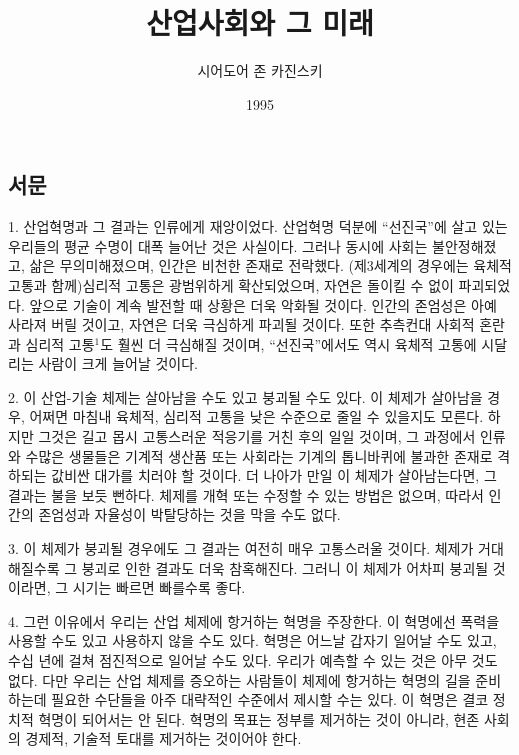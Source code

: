 \documentclass[11pt,a4paper]{article}
\title{산업사회와 그 미래}
\author{시어도어 존 카진스키}
\date{1995}
\begin{document}
\begin{multicols}{2}

\maketitle



\section*{서문}


1. 산업혁명과 그 결과는 인류에게 재앙이었다. 산업혁명 덕분에 “선진국”에 살고 있는 우리들의 평균  수명이 대폭 늘어난 것은 사실이다. 그러나 동시에 사회는 불안정해졌고, 삶은 무의미해졌으며, 인간은  비천한 존재로 전락했다. (제3세계의 경우에는 육체적 고통과 함께)심리적 고통은 광범위하게  확산되었으며, 자연은 돌이킬 수 없이 파괴되었다. 앞으로 기술이 계속 발전할 때 상황은 더욱 악화될  것이다. 인간의 존엄성은 아예 사라져 버릴 것이고, 자연은 더욱 극심하게 파괴될 것이다. 또한 추측컨대  사회적 혼란과 심리적 고통\hyperlink{1}{$^{1}$}도 훨씬 더 극심해질 것이며, “선진국”에서도 역시 육체적 고통에 시달리는  사람이 크게 늘어날 것이다.  


2. 이 산업-기술 체제는 살아남을 수도 있고 붕괴될 수도 있다. 이 체제가 살아남을 경우, 어쩌면 마침내  육체적, 심리적 고통을 낮은 수준으로 줄일 수 있을지도 모른다. 하지만 그것은 길고 몹시 고통스러운  적응기를 거친 후의 일일 것이며, 그 과정에서 인류와 수많은 생물들은 기계적 생산품 또는 사회라는  기계의 톱니바퀴에 불과한 존재로 격하되는 값비싼 대가를 치러야 할 것이다. 더 나아가 만일 이 체제가  살아남는다면, 그 결과는 불을 보듯 뻔하다. 체제를 개혁 또는 수정할 수 있는 방법은 없으며, 따라서  인간의 존엄성과 자율성이 박탈당하는 것을 막을 수도 없다.  


3. 이 체제가 붕괴될 경우에도 그 결과는 여전히 매우 고통스러울 것이다. 체제가 거대해질수록 그 붕괴로 인한 결과도 더욱 참혹해진다. 그러니 이 체제가 어차피 붕괴될 것이라면, 그 시기는 빠르면 빠를수록  좋다. 


4. 그런 이유에서 우리는 산업 체제에 항거하는 혁명을 주장한다. 이 혁명에선 폭력을 사용할 수도 있고  사용하지 않을 수도 있다. 혁명은 어느날 갑자기 일어날 수도 있고, 수십 년에 걸쳐 점진적으로 일어날  수도 있다. 우리가 예측할 수 있는 것은 아무 것도 없다. 다만 우리는 산업 체제를 증오하는 사람들이 체제에 항거하는 혁명의 길을 준비하는데 필요한 수단들을 아주 대략적인 수준에서 제시할 수는 있다. 이 혁명은 결코 정치적 혁명이 되어서는 안 된다. 혁명의 목표는 정부를 제거하는 것이 아니라, 현존 사회의  경제적, 기술적 토대를 제거하는 것이어야 한다. 



\end{multicols}
\end{document}
